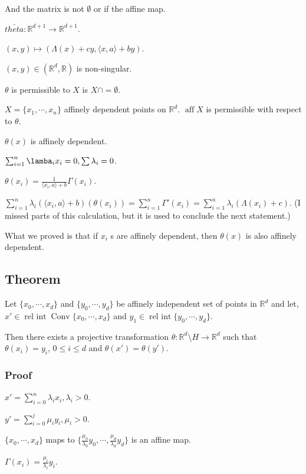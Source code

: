 \documentclass[11pt]{article}
\def\R{\mathbb{R}}
\def\aff{\operatorname{aff}}
\def\relint{\operatorname{rel\ int}}
\def\conv{\operatorname{Conv}}
\begin{document}
{{{{And the matrix is not \(\emptyset\) or if the affine map.

\(\bar{theta} \colon \R^{d+1} \rightarrow \R^{d+1}\).

\((x, y) \mapsto (\Lambda(x) + cy, \langle x, a \rangle + by)\).

\((x, y) \in (\R^d, \R)\) is non-singular.

\(\theta\) is permissible to \(X\) is \(X \cap = \emptyset\).

\(X = \{x_1, \cdots, x_n\}\) affinely dependent points on \(\R^d\). \(\aff X\) is
permissible with respect to \(\theta\).

\(\theta(x)\) is affinely dependent.

\(\sum_{i = 1}^{n} \lamba_i x_i = 0, \sum \lambda_i = 0\).

\(\theta(x_i)= \frac{1}{\langle x_i, a \rangle + b} \Gamma(x_i)\).

\(\sum_{i = 1}^{n} \lambda_i(\langle x_i, a\rangle + b)(\theta(x_i)) = \sum_{i
   = 1}^{n} \Gamma'(x_i) = \sum_{i = 1}^{n} \lambda_i(\Lambda(x_i) + c)\). (I
missed parts of this calculation, but it is used to conclude the next statement.)

What we proved is that if \(x_i\) s are affinely dependent, then \(\theta(x)\) is
also affinely dependent.
\subsection{Theorem}
\label{sec:org972b14e}
Let \(\{x_0, \cdots, x_d\}\) and \(\{y_0, \cdots, y_d\}\) be affinely independent
set of points in \(\R^d\) and let, \(x' \in \relint \conv \{x_0, \cdots, x_d\}\)
and \(y_1 \in \relint \{y_0, \cdots, y_d\}\).

Then there exists a projective transformation \(\theta \colon \R^d \setminus H
   \rightarrow \R^d\) such that \(\theta(x_i) = y_i\), \(0 \le i \le d\) and
\(\theta(x') = \theta(y')\).
\subsubsection{Proof}
\label{sec:org3afe499}
\(x' = \sum_{i = 0}^{n} \lambda_i x_i, \lambda_i > 0\).

\(y' = \sum_{i =0}^{j} \mu_i y_i, \mu_i > 0\).

\(\{x_0, \cdots, x_d\}\) maps to \(\{\frac{\mu_0}{\lambda_0} y_0, \cdots,
    \frac{\mu_d}{\lambda_d} y_d\}\) is an affine map.

\(\Gamma(x_i) = \frac{\mu_i}{\lambda_i} y_i\).

}}}}
\end{document}
